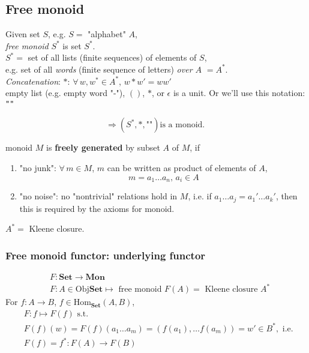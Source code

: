 \documentclass[10pt]{amsart}
\begin{document}
\begin{multicols*}{2}
\subsection{Free monoid}

Given set $S$, e.g. $S = $ "alphabet" $A$, \\
\emph{free monoid} $S^*$ is set $S^*$. \\

$S^* = $ set of all lists (finite sequences) of elements of $S$, \\
e.g. set of all \emph{words} (finite sequence of letters) \emph{over $A$ } $= A^*$. \\

\emph{Concatenation}: $* : \, \forall \, w , w^* \in A^*$, $w * w' = ww'$ \\
empty list (e.g. empty word "-"), $()$, $*$, or $\epsilon$ is a unit. Or we'll use this notation: \texttt{""}

\[
\Longrightarrow (S^*, *, \texttt{""}) \text{is a monoid. }
\]

monoid $M$ is \textbf{freely generated} by subset $A$ of $M$, if 
\begin{enumerate}
	\item "no junk": $\forall \, m \in M$, $m$ can be written as product of elements of $A$,
	\[
	m = a_1 \dots a_n, \, a_i \in A 
	\]
	\item "no noise": no "nontrivial" relations hold in $M$, i.e. if $a_1 \dots a_j = a_1' \dots a_k'$, then this is required by the axioms for monoid.
\end{enumerate}

$A^* = $ Kleene closure.

\subsubsection{Free monoid functor: underlying functor}

\[
\begin{aligned}
& F: \textbf{Set} \to \textbf{Mon} \\
& F: A \in \text{Obj}\textbf{Set} \mapsto \text{ free monoid } F(A) = \text{ Kleene closure } A^* 
\end{aligned}
\]
For $f:A \to B$, $f\in \text{Hom}_{\textbf{Set}}(A, B)$, 
\[
\begin{aligned}
& F: f\mapsto F(f) \text{ s.t. } \\
& F(f)(w) = F(f)(a_1 \dots a_m) = (f(a_1), \dots f(a_m)) = w' \in B^*, \text{ i.e. } \\
& F(f) = f^* : F(A) \to F(B)
\end{aligned}
\]



\end{multicols*}
\end{document}

